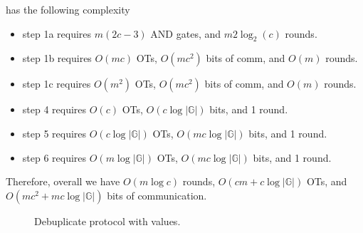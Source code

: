  has the following complexity
\begin{itemize}
    \item step 1a requires $m(2 c-3)$ AND gates, and $m2\log_2(c)$ rounds.
    \item step 1b requires $O(mc)$ OTs, $O(mc^2)$ bits of comm, and $O(m)$ rounds.
    \item step 1c requires $O(m^2)$ OTs, $O(mc^2)$ bits of comm, and $O(m)$ rounds.
    \item step 4 requires $O(c)$ OTs, $O(c\log |\mathbb{G}|)$ bits, and 1 round.
    \item step 5 requires $O(c\log |\mathbb{G}|)$ OTs, $O(mc\log |\mathbb{G}|)$ bits, and 1 round.
    \item step 6 requires $O(m\log |\mathbb{G}|)$ OTs, $O(mc\log |\mathbb{G}|)$ bits, and 1 round.
\end{itemize}

\noindent Therefore, overall we have $O(m\log c)$ rounds, $O(cm+c\log |\mathbb{G}|)$ OTs, and $O(mc^2+ mc\log |\mathbb{G}|)$ bits of communication.





\begin{figure}[H]\small
	\centering
\caption{Debuplicate protocol with values.\label{fig:debup}
}
\end{figure}


